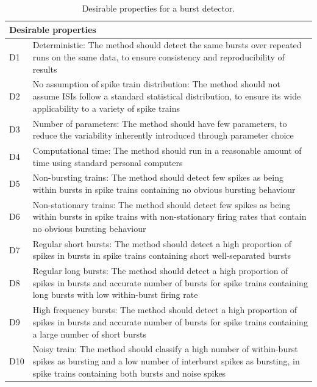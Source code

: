 \documentclass[12pt, titlepage]{article}
\begin{document}
			\begin{table}[h] \centering 	{}
				\begin{tabular}{|l|m{13cm}|}
					\hline \multicolumn{2}{|l|}{Desirable properties}
					\\ \hline
					D1 & Deterministic: The method should detect the same bursts over repeated runs on the same  data, to ensure consistency and reproducibility of results
					\\ D2 & No assumption of spike train distribution: The method should not assume ISIs follow a standard statistical  
					distribution, to ensure its wide applicability to a variety of spike trains
					\\  D3 & Number of parameters: The method should have few parameters, to reduce the variability inherently introduced through parameter choice
					\\D4 & Computational time: The method should run in a reasonable amount of time using standard personal computers
					\\ D5 & Non-bursting trains: The method should detect few spikes as being within bursts in spike trains containing no obvious bursting behaviour
					\\D6 & Non-stationary trains: The method should detect few spikes as being within bursts in spike trains with non-stationary firing rates that contain no obvious bursting behaviour 
					\\ D7 & Regular short bursts: The method should detect a high proportion of spikes in bursts in spike trains containing short well-separated bursts
					\\D8 & Regular long bursts: The method should detect a high proportion of spikes in bursts and accurate  number of bursts for spike trains containing long bursts with low within-burst firing rate
					\\  D9 & High frequency bursts: The method should detect a high proportion of spikes in bursts and accurate number of bursts  for spike trains containing a large number of short bursts
					\\D10 & Noisy train: The method should classify a high number of within-burst spikes as bursting and a low number of interburst spikes as bursting, in spike trains containing both bursts and noise spikes
					\\ \hline
				\end{tabular} \caption{Desirable properties for a burst detector.}
				\label{des_prop}
			\end{table}
\end{document}
